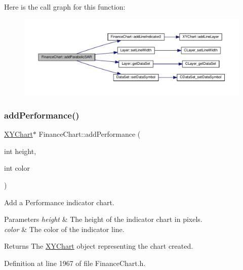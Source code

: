 Here is the call graph for this function\+:
\nopagebreak
\begin{figure}[H]
\begin{center}
\leavevmode
\includegraphics[width=350pt]{class_finance_chart_a1f8317ff1ee6936114a408c7139e64d1_cgraph}
\end{center}
\end{figure}
\mbox{\label{class_finance_chart_a86b3b47168753b4876b38464ecc5ab33}} 
\subsubsection{\texorpdfstring{add\+Performance()}{addPerformance()}}
{\footnotesize\ttfamily \hyperlink{class_x_y_chart}{X\+Y\+Chart}$\ast$ Finance\+Chart\+::add\+Performance (\begin{DoxyParamCaption}\item[{int}]{height,  }\item[{int}]{color }\end{DoxyParamCaption})\hspace{0.3cm}{\ttfamily [inline]}}



Add a Performance indicator chart. 


\begin{DoxyParams}{Parameters}
{\em height} & The height of the indicator chart in pixels.\\
\hline
{\em color} & The color of the indicator line.\\
\hline
\end{DoxyParams}
\begin{DoxyReturn}{Returns}
The \hyperlink{class_x_y_chart}{X\+Y\+Chart} object representing the chart created.
\end{DoxyReturn}


Definition at line 1967 of file Finance\+Chart.\+h.

